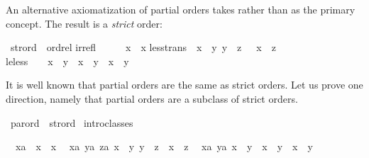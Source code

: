 \begin{isabellebody}
%
%
\begin{isamarkuptext}%
An alternative axiomatization of partial orders takes \isa{{\isacharless}{\isacharless}} rather than
\isa{{\isacharless}{\isacharless}{\isacharequal}} as the primary concept. The result is a \emph{strict} order:%
\end{isamarkuptext}%
\ strord\ {\isacharless}\ ordrel\isanewline
irrefl{\isacharcolon}\ \ \ \ \ {\isachardoublequote}{\isasymnot}\ x\ {\isacharless}{\isacharless}\ x{\isachardoublequote}\isanewline
less{\isacharunderscore}trans{\isacharcolon}\ {\isachardoublequote}{\isasymlbrakk}\ x\ {\isacharless}{\isacharless}\ y{\isacharsemicolon}\ y\ {\isacharless}{\isacharless}\ z\ {\isasymrbrakk}\ {\isasymLongrightarrow}\ x\ {\isacharless}{\isacharless}\ z{\isachardoublequote}\isanewline
le{\isacharunderscore}less{\isacharcolon}\ \ \ \ {\isachardoublequote}x\ {\isacharless}{\isacharless}{\isacharequal}\ y\ {\isacharequal}\ {\isacharparenleft}x\ {\isacharless}{\isacharless}\ y\ {\isasymor}\ x\ {\isacharequal}\ y{\isacharparenright}{\isachardoublequote}%
\begin{isamarkuptext}%
\noindent
It is well known that partial orders are the same as strict orders. Let us
prove one direction, namely that partial orders are a subclass of strict
orders.%
\end{isamarkuptext}%
\ parord\ {\isacharless}\ strord\isanewline
{}\ intro{\isacharunderscore}classes%
\begin{isamarkuptxt}%
\noindent
\begin{isabelle}%
\ {}{\isachardot}\ {\isasymAnd}x{\isasymColon}{\isacharprime}a{\isachardot}\ {\isasymnot}\ x\ {\isacharless}{\isacharless}\ x\isanewline
\ {}{\isachardot}\ {\isasymAnd}{\isacharparenleft}x{\isasymColon}{\isacharprime}a{\isacharparenright}\ {\isacharparenleft}y{\isasymColon}{\isacharprime}a{\isacharparenright}\ z{\isasymColon}{\isacharprime}a{\isachardot}\ {\isasymlbrakk}x\ {\isacharless}{\isacharless}\ y{\isacharsemicolon}\ y\ {\isacharless}{\isacharless}\ z{\isasymrbrakk}\ {\isasymLongrightarrow}\ x\ {\isacharless}{\isacharless}\ z\isanewline
\ {}{\isachardot}\ {\isasymAnd}{\isacharparenleft}x{\isasymColon}{\isacharprime}a{\isacharparenright}\ y{\isasymColon}{\isacharprime}a{\isachardot}\ {\isacharparenleft}x\ {\isacharless}{\isacharless}{\isacharequal}\ y{\isacharparenright}\ {\isacharequal}\ {\isacharparenleft}x\ {\isacharless}{\isacharless}\ y\ {\isasymor}\ x\ {\isacharequal}\ y{\isacharparenright}\isanewline

\end{isabelle}
\end{isamarkuptxt}
\end{isabellebody}
